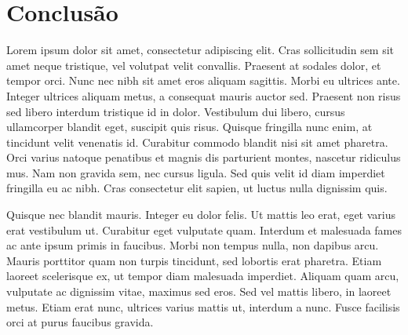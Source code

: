 \section{Conclusão}
Lorem ipsum dolor sit amet, consectetur adipiscing elit.
Cras sollicitudin sem sit amet neque tristique, vel volutpat velit convallis.
Praesent at sodales dolor, et tempor orci.
Nunc nec nibh sit amet eros aliquam sagittis.
Morbi eu ultrices ante. 
Integer ultrices aliquam metus, a consequat mauris auctor sed. 
Praesent non risus sed libero interdum tristique id in dolor. 
Vestibulum dui libero, cursus ullamcorper blandit eget, suscipit quis risus. 
Quisque fringilla nunc enim, at tincidunt velit venenatis id. 
Curabitur commodo blandit nisi sit amet pharetra. 
Orci varius natoque penatibus et magnis dis parturient montes, nascetur ridiculus mus. 
Nam non gravida sem, nec cursus ligula. Sed quis velit id diam imperdiet fringilla eu ac nibh. 
Cras consectetur elit sapien, ut luctus nulla dignissim quis.
 
Quisque nec blandit mauris. Integer eu dolor felis. Ut mattis leo erat, eget varius erat vestibulum ut. Curabitur eget vulputate quam. Interdum et malesuada fames ac ante ipsum primis in faucibus. Morbi non tempus nulla, non dapibus arcu. Mauris porttitor quam non turpis tincidunt, sed lobortis erat pharetra. Etiam laoreet scelerisque ex, ut tempor diam malesuada imperdiet. Aliquam quam arcu, vulputate ac dignissim vitae, maximus sed eros. Sed vel mattis libero, in laoreet metus. Etiam erat nunc, ultrices varius mattis ut, interdum a nunc. Fusce facilisis orci at purus faucibus gravida.
